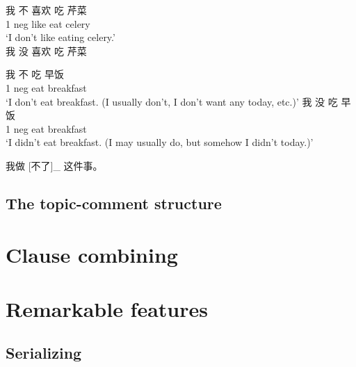 \documentclass[UTF8, a4paper, oneside, scheme=plain]{ctexrep}
\newcommand{\translate}[1]{`#1'}
\begin{document}
\begin{exe}
    \ex \begin{xlist}
        \ex \gll 我 不 喜欢 吃 芹菜 \\
        1 \acs{neg} like eat celery \\
        \glt \translate{I don't like eating celery.} \\
        \ex * 我 没 喜欢 吃 芹菜
    \end{xlist}
    \label{ex:chiqincai}
\end{exe}

\begin{exe}
    \ex \begin{xlist}
        \ex \gll 我 不 吃 早饭 \\
        1 \acs{neg} eat breakfast \\
        \glt \translate{I don't eat breakfast. (I usually don't, I don't want any today, etc.)}
        \ex \gll 我 没 吃 早饭 \\
        1 \acs{neg} eat breakfast \\
        \glt \translate{I didn't eat breakfast. (I may usually do, but somehow I didn't today.)}
    \end{xlist}
    \label{ex:buchi-meichi}
\end{exe}

\begin{exe}
    \ex \begin{xlist}
        \ex 我做 [不了]_{} 这件事。
    \end{xlist}    
    \label{ex:zuobuliao-example}
\end{exe}

\subsection{The topic-comment structure}



\section{Clause combining}

\section{Remarkable features}

\subsection{Serializing}
\end{document}
